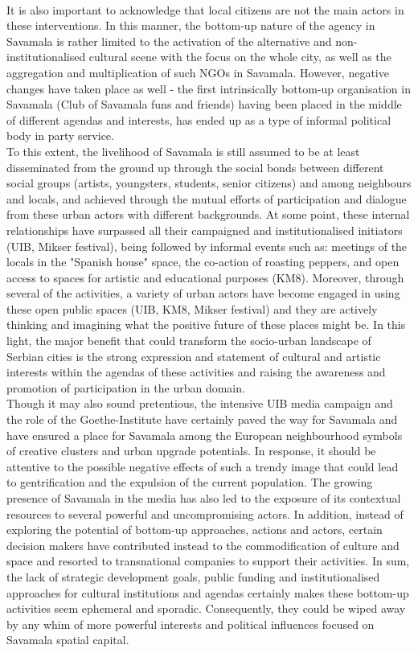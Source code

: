 \documentclass[11pt]{report}
\begin{document}
\\
It is also important to acknowledge that local citizens are not the main actors in these interventions. In this manner, the bottom-up nature of the agency in Savamala is rather limited to the activation of the alternative and non-institutionalised cultural scene with the focus on the whole city, as well as the aggregation and multiplication of such NGOs in Savamala. However, negative changes have taken place as well - the first intrinsically bottom-up organisation in Savamala (Club of Savamala funs and friends) having been placed in the middle of different agendas and interests, has ended up as a type of informal political body in party service.
\\
To this extent, the livelihood of Savamala is still assumed to be at least disseminated from the ground up through the social bonds between different social groups (artists, youngsters, students, senior citizens) and among neighbours and locals, and achieved through the mutual efforts of participation and dialogue from these urban actors with different backgrounds. At some point, these internal relationships have surpassed all their campaigned and institutionalised initiators (UIB, Mikser festival), being followed by informal events such as: meetings of the locals in the "Spanish house" space, the co-action of roasting peppers, and open access to spaces for artistic and educational purposes (KM8). Moreover, through several of the activities, a variety of urban actors have become engaged in using these open public spaces (UIB, KM8, Mikser festival) and they are actively thinking and imagining what the positive future of these places might be. In this light, the major benefit that could transform the socio-urban landscape of Serbian cities is the strong expression and statement of cultural and artistic interests within the agendas of these activities and raising the awareness and promotion of participation in the urban domain.
\\
Though it may also sound pretentious, the intensive UIB media campaign  and the role of the Goethe-Institute have certainly paved the way for Savamala and have ensured a place for Savamala among the European neighbourhood symbols of creative clusters and urban upgrade potentials. In response, it should be attentive to the possible negative effects of such a trendy image that could lead to gentrification and the expulsion of the current population. The growing presence of Savamala in the media has also led to the exposure of its contextual resources to several powerful and uncompromising actors. In addition, instead of exploring the potential of bottom-up approaches, actions and actors, certain decision makers have contributed instead to the commodification of culture and space and resorted to transnational companies  to support their activities. In sum, the lack of strategic development goals, public funding and institutionalised approaches for cultural institutions and agendas certainly makes these bottom-up activities seem ephemeral and sporadic. Consequently, they could be wiped away by any whim of more powerful interests and political influences focused on Savamala spatial capital.
\end{document}
